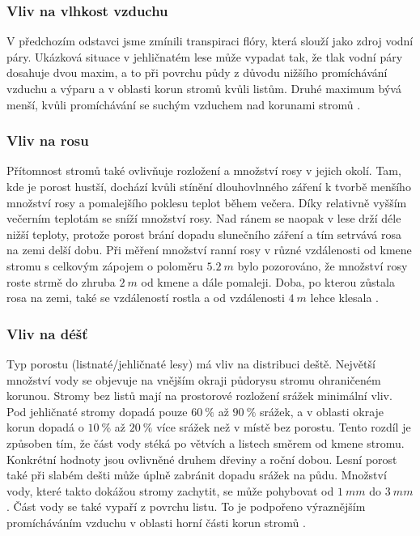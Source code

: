 \subsubsection{Vliv na vlhkost vzduchu}
V předchozím odstavci jsme zmínili transpiraci flóry, která slouží jako zdroj vodní páry. Ukázková situace v jehličnatém lese může vypadat tak, že tlak vodní páry dosahuje dvou maxim, a to při povrchu půdy z důvodu nižšího promíchávání vzduchu a výparu a v oblasti korun stromů kvůli listům. Druhé maximum bývá menší, kvůli promíchávání se suchým vzduchem nad korunami stromů \parencite{alma}. 

\subsubsection{Vliv na rosu}
Přítomnost stromů také ovlivňuje rozložení a množství rosy v jejich okolí. Tam, kde je porost hustší, dochází kvůli stínění dlouhovlnného záření k tvorbě menšího množství rosy a pomalejšího poklesu teplot během večera. Díky relativně vyšším večerním teplotám se sníží množství rosy. Nad ránem se naopak v lese drží déle nižší teploty, protože porost brání dopadu slunečního záření a tím setrvává rosa na zemi delší dobu. Při měření množství ranní rosy v různé vzdálenosti od kmene stromu s celkovým zápojem o poloměru $\SI{5.2}{m}$ bylo pozorováno, že množství rosy roste strmě do zhruba $\SI{2}{m}$ od kmene a dále pomaleji. Doba, po kterou zůstala rosa na zemi, také se vzdáleností rostla a od vzdálenosti $\SI{4}{m}$ lehce klesala \parencite{alma}.

\subsubsection{Vliv na déšť}
Typ porostu (listnaté/jehličnaté lesy) má vliv na distribuci deště. Největší množství vody se objevuje na vnějším okraji půdorysu stromu ohraničeném korunou. Stromy bez listů mají na prostorové rozložení srážek minimální vliv. Pod jehličnaté stromy dopadá pouze $\SI{60}{\%}$ až $\SI{90}{\%}$ srážek, a v oblasti okraje korun dopadá o $\SI{10}{\%}$ až $\SI{20}{\%}$ více srážek než v místě bez porostu. Tento rozdíl je způsoben tím, že část vody stéká po větvích a listech směrem od kmene stromu. Konkrétní hodnoty jsou ovlivněné druhem dřeviny a roční dobou. Lesní porost také při slabém dešti může úplně zabránit dopadu srážek na půdu. Množství vody, které takto dokážou stromy zachytit, se může pohybovat od $\SI{1}{mm}$ do $\SI{3}{mm}$. Část vody se také vypaří z povrchu listu. To je podpořeno výraznějším promícháváním vzduchu v oblasti horní části korun stromů \parencite{alma}.

